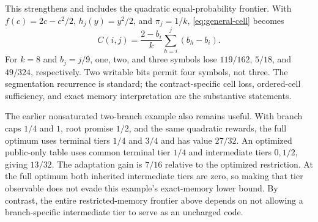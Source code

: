 This strengthens and includes the quadratic equal-probability frontier. With $f(c)=2c-c^2/2$, $h_j(y)=y^2/2$, and $\pi_j=1/k$, \eqref{eq:general-cell} becomes
\begin{equation}\label{eq:old-cell}
 C(i,j)=\frac{2-b_i}{k}\sum_{h=i}^j(b_h-b_i).
\end{equation}
For $k=8$ and $b_j=j/9$, one, two, and three symbols lose $119/162$, $5/18$, and $49/324$, respectively. Two writable bits permit four symbols, not three. The segmentation recurrence is standard; the contract-specific cell loss, ordered-cell sufficiency, and exact memory interpretation are the substantive statements.

The earlier nonsaturated two-branch example also remains useful. With branch caps $1/4$ and $1$, root promise $1/2$, and the same quadratic rewards, the full optimum uses terminal tiers $1/4$ and $3/4$ and has value $27/32$. An optimized public-only table uses common terminal tier $1/4$ and intermediate tiers $0,1/2$, giving $13/32$. The adaptation gain is $7/16$ relative to the optimized restriction. At the full optimum both inherited intermediate tiers are zero, so making that tier observable does not evade this example's exact-memory lower bound. By contrast, the entire restricted-memory frontier above depends on not allowing a branch-specific intermediate tier to serve as an uncharged code.

